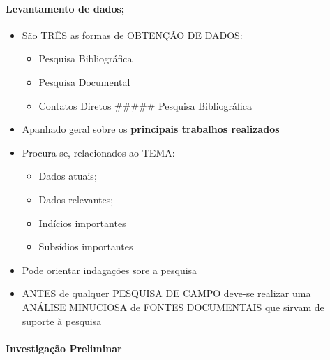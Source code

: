 \documentclass[
]{book}
\providecommand{\tightlist}{%
  \setlength{\itemsep}{0pt}\setlength{\parskip}{0pt}}
\begin{document}
\hypertarget{levantamento-de-dados}{%
\paragraph{Levantamento de dados;}\label{levantamento-de-dados}}

\begin{itemize}
\tightlist
\item
  São TRÊS as formas de OBTENÇÃO DE DADOS:

  \begin{itemize}
  \tightlist
  \item
    Pesquisa Bibliográfica
  \item
    Pesquisa Documental
  \item
    Contatos Diretos
    \#\#\#\#\# Pesquisa Bibliográfica
  \end{itemize}
\item
  Apanhado geral sobre os \textbf{principais trabalhos realizados}
\item
  Procura-se, relacionados ao TEMA:

  \begin{itemize}
  \tightlist
  \item
    Dados atuais;
  \item
    Dados relevantes;
  \item
    Indícios importantes
  \item
    Subsídios importantes
  \end{itemize}
\item
  Pode orientar indagações sore a pesquisa
\item
  ANTES de qualquer PESQUISA DE CAMPO deve-se realizar uma ANÁLISE MINUCIOSA de FONTES DOCUMENTAIS que sirvam de suporte à pesquisa
\end{itemize}

\hypertarget{investigauxe7uxe3o-preliminar}{%
\paragraph{Investigação Preliminar}\label{investigauxe7uxe3o-preliminar}}
\end{document}

